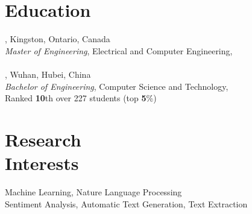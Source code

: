 \documentclass[mm]{simple_style}
\begin{document}

\begin{resume}

\section{Education}
, Kingston, Ontario, Canada\\
{\sl Master of Engineering}, Electrical and Computer Engineering, \\
\\
\newline
{}, Wuhan, Hubei, China\\
{\sl Bachelor of Engineering}, Computer Science and Technology, \\
 Ranked \textbf{10}th over 227 students (top \textbf{5}\%)\\
\sectionline

\section{Research\\Interests}
\par
Machine Learning, Nature Language Processing\\
Sentiment Analysis, Automatic Text Generation, Text Extraction

\sectionline

\end{resume}
\end{document}
